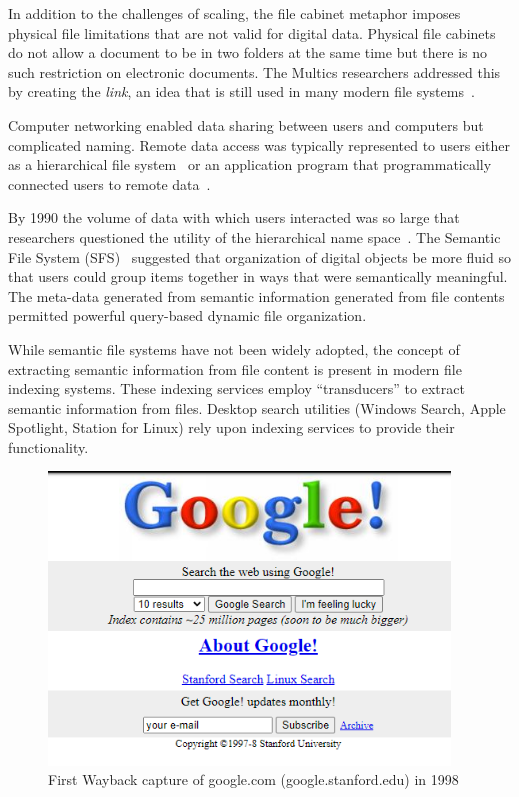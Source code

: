 In addition to the challenges of scaling, the file cabinet metaphor imposes
physical file limitations that are not valid for digital data.
Physical file cabinets do not allow a document to be in two folders at the same
time but there is no such restriction on electronic documents. The Multics
researchers addressed this by creating the \emph{link}, an idea that is
still used in many modern file systems~\cite{daley1965general}.

Computer networking enabled data sharing between users and computers but
complicated naming. Remote data access was typically represented to users either
as a hierarchical file system~\cite{nfs,howard1988scale} or an application program that programmatically
connected users to remote data~\cite{levin1979transport,10.1145/800216.806594,birrell1982grapevine}.

By 1990 the volume of data with which users interacted was so
large that researchers questioned the utility of the hierarchical name space~\cite{vicente1987assaying}.
The Semantic File System (SFS)~\cite{gifford1991semantic} suggested that
organization of digital objects be more fluid so that
users could group items together in ways that were semantically meaningful. The
meta-data generated from semantic information generated from file contents
permitted powerful query-based dynamic file organization.

While semantic file systems have not been widely adopted, the concept of
extracting semantic information from file content is present in modern file
indexing systems.  These indexing services employ ``transducers'' to extract
semantic information from files. Desktop search utilities (Windows
Search, Apple Spotlight, Station for Linux) rely upon indexing services to
provide their functionality.

\begin{figure}
    \centering
    \caption{First Wayback capture of google.com (google.stanford.edu) in 1998}
    \label{fig:google}
    \includegraphics[width=0.95\textwidth]{figures/1998-11-11-Google-Screenshot-showing-early-index-size.png}
\end{figure}

